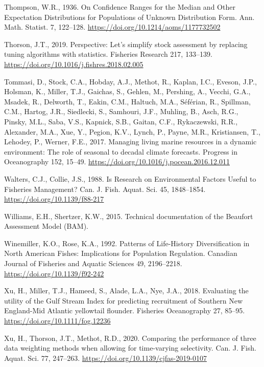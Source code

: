 \documentclass[]{article}
\begin{document}
\leavevmode\hypertarget{ref-thompson1936Confidence}{}%
Thompson, W.R., 1936. On Confidence Ranges for the Median and Other
Expectation Distributions for Populations of Unknown Distribution Form.
Ann. Math. Statist. 7, 122--128.
\url{https://doi.org/10.1214/aoms/1177732502}

\leavevmode\hypertarget{ref-thorson2019Perspective}{}%
Thorson, J.T., 2019. Perspective: Let's simplify stock assessment by
replacing tuning algorithms with statistics. Fisheries Research 217,
133--139. \url{https://doi.org/10.1016/j.fishres.2018.02.005}

\leavevmode\hypertarget{ref-tommasi2017Managing}{}%
Tommasi, D., Stock, C.A., Hobday, A.J., Methot, R., Kaplan, I.C.,
Eveson, J.P., Holsman, K., Miller, T.J., Gaichas, S., Gehlen, M.,
Pershing, A., Vecchi, G.A., Msadek, R., Delworth, T., Eakin, C.M.,
Haltuch, M.A., Séférian, R., Spillman, C.M., Hartog, J.R., Siedlecki,
S., Samhouri, J.F., Muhling, B., Asch, R.G., Pinsky, M.L., Saba, V.S.,
Kapnick, S.B., Gaitan, C.F., Rykaczewski, R.R., Alexander, M.A., Xue,
Y., Pegion, K.V., Lynch, P., Payne, M.R., Kristiansen, T., Lehodey, P.,
Werner, F.E., 2017. Managing living marine resources in a dynamic
environment: The role of seasonal to decadal climate forecasts. Progress
in Oceanography 152, 15--49.
\url{https://doi.org/10.1016/j.pocean.2016.12.011}

\leavevmode\hypertarget{ref-walters1988Research}{}%
Walters, C.J., Collie, J.S., 1988. Is Research on Environmental Factors
Useful to Fisheries Management? Can. J. Fish. Aquat. Sci. 45,
1848--1854. \url{https://doi.org/10.1139/f88-217}

\leavevmode\hypertarget{ref-williams2015BAM}{}%
Williams, E.H., Shertzer, K.W., 2015. Technical documentation of the
Beaufort Assessment Model (BAM).

\leavevmode\hypertarget{ref-winemiller1992Patterns}{}%
Winemiller, K.O., Rose, K.A., 1992. Patterns of Life-History
Diversification in North American Fishes: Implications for Population
Regulation. Canadian Journal of Fisheries and Aquatic Sciences 49,
2196--2218. \url{https://doi.org/10.1139/f92-242}

\leavevmode\hypertarget{ref-xu2018Evaluating}{}%
Xu, H., Miller, T.J., Hameed, S., Alade, L.A., Nye, J.A., 2018.
Evaluating the utility of the Gulf Stream Index for predicting
recruitment of Southern New England-Mid Atlantic yellowtail flounder.
Fisheries Oceanography 27, 85--95.
\url{https://doi.org/10.1111/fog.12236}

\leavevmode\hypertarget{ref-xu2020Comparing}{}%
Xu, H., Thorson, J.T., Methot, R.D., 2020. Comparing the performance of
three data weighting methods when allowing for time-varying selectivity.
Can. J. Fish. Aquat. Sci. 77, 247--263.
\url{https://doi.org/10.1139/cjfas-2019-0107}
\end{document}
